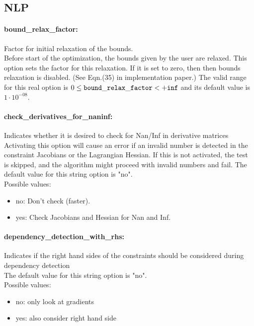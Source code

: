 \subsection{NLP}
\label{sec:NLP}
\paragraph{bound\_relax\_factor:}\label{sec:bound_relax_factor} Factor for initial relaxation of the bounds. $\;$ \\
 Before start of the optimization, the bounds
given by the user are relaxed.  This option sets
the factor for this relaxation.  If it is set to
zero, then then bounds relaxation is disabled.
(See Eqn.(35) in implementation paper.) The valid range for this real option is 
$0 \le {\tt bound\_relax\_factor } <  {\tt +inf}$
and its default value is $1 \cdot 10^{-08}$.


\paragraph{check\_derivatives\_for\_naninf:}\label{sec:check_derivatives_for_naninf} Indicates whether it is desired to check for Nan/Inf in derivative matrices $\;$ \\
 Activating this option will cause an error if an
invalid number is detected in the constraint
Jacobians or the Lagrangian Hessian.  If this is
not activated, the test is skipped, and the
algorithm might proceed with invalid numbers and
fail.
The default value for this string option is "no".
\\ 
Possible values:
\begin{itemize}
   \item no: Don't check (faster).
   \item yes: Check Jacobians and Hessian for Nan and Inf.
\end{itemize}

\paragraph{dependency\_detection\_with\_rhs:}\label{sec:dependency_detection_with_rhs} Indicates if the right hand sides of the constraints should be considered during dependency detection $\;$ \\

The default value for this string option is "no".
\\ 
Possible values:
\begin{itemize}
   \item no: only look at gradients
   \item yes: also consider right hand side
\end{itemize}

